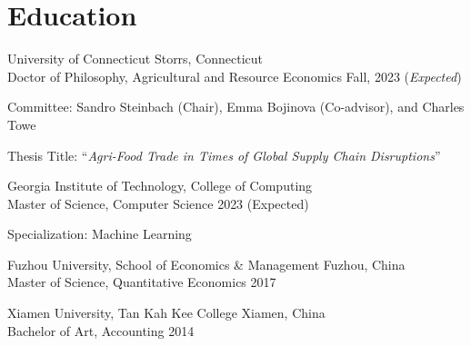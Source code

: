 \documentclass[11 pt,letterpaper]{article}
\renewenvironment{itemize}{
	\begin{list}{}{
			\setlength{\leftmargin}{1.5em}
		}
	}{
	\end{list}
}
\begin{document}
	\section*{\textbf{ Education}}
	\begin{itemize}
		\item[-]  University of Connecticut  \hfill Storrs, Connecticut \\
	 Doctor of Philosophy, Agricultural and Resource Economics  \hfill  Fall, 2023 (\textit{Expected})
	
			
			Committee:	 	 Sandro Steinbach  (Chair),
			Emma Bojinova (Co-advisor), and Charles Towe 
			
			Thesis Title: ``\textit{Agri-Food Trade in Times of Global Supply Chain Disruptions}''
			
 
		 
	
		 \item[-]    Georgia Institute of Technology, College of  Computing \hfill      \\ 
		 Master of Science, Computer Science  \hfill      2023 (Expected)
 
	Specialization: Machine Learning
 
		\item[-]  Fuzhou University, School of Economics \& Management \hfill Fuzhou, China \\ 
		Master of Science,   Quantitative Economics  \hfill    2017
		
				
		\item[-]  Xiamen University, Tan Kah Kee College    \hfill  Xiamen, China \\
		Bachelor of Art,  Accounting \hfill    2014
		

\end{itemize}
\end{document}
